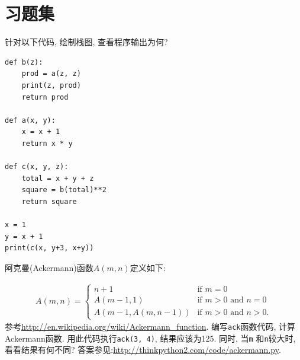 \documentclass[10pt]{book}
\begin{document}
\section{习题集}

\begin{exercise}
针对以下代码, 绘制栈图, 查看程序输出为何?

\begin{verbatim}
def b(z):
    prod = a(z, z)
    print(z, prod)
    return prod

def a(x, y):
    x = x + 1
    return x * y

def c(x, y, z):
    total = x + y + z
    square = b(total)**2
    return square

x = 1
y = x + 1
print(c(x, y+3, x+y))
\end{verbatim}

\end{exercise}


\begin{exercise}
\label{ackermann}

阿克曼(Ackermann)函数$A(m, n)$定义如下:

\begin{eqnarray*}
A(m, n) = \begin{cases} 
              n+1 & \mbox{if } m = 0 \\ 
        A(m-1, 1) & \mbox{if } m > 0 \mbox{ and } n = 0 \\ 
A(m-1, A(m, n-1)) & \mbox{if } m > 0 \mbox{ and } n > 0.
\end{cases} 
\end{eqnarray*}
%
参考\url{http://en.wikipedia.org/wiki/Ackermann_function}.
编写{\tt ack}函数代码, 计算Ackermann函数. 
用此代码执行{\tt ack(3, 4)}, 结果应该为125. 
同时, 当{\tt m} 和{\tt n}较大时, 看看结果有何不同? 
答案参见:\url{http://thinkpython2.com/code/ackermann.py}.

\end{exercise}
\end{document}
